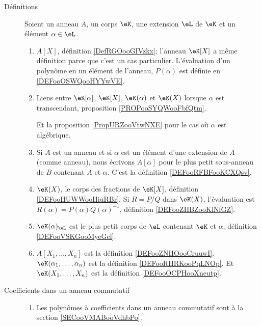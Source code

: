 
\begin{description}
    \item[Définitions]
        Soient un anneau \( A\), un corps \( \eK\), une extension \( \eL\) de \( \eK\) et un élément \( \alpha\in \eL\).
        \begin{enumerate}
            \item
                \( A[X]\), définition \ref{DefRGOooGIVzkx}; l'anneau \( \eK[X]\) a même définition parce que c'est un cas particulier. L'évaluation d'un polynôme en un élément de l'anneau, \( P(\alpha)\) est définie en \ref{DEFooOSWQooHYYwVE}.
            \item
                Liens entre \( \eK[\alpha]\), \( \eK[X]\), \( \eK(\alpha)\) et \( \eK(X)\) lorsque \( \alpha\) est transcendant, proposition \ref{PROPooSYQWooFbfQtm}.

                Et la proposition \ref{PropURZooVtwNXE} pour le cas où \( \alpha\) est algébrique.
            \item 
                Si \( A\) est un anneau et si \( \alpha\) est un élément d'une extension de \( A\) (comme anneau), nous écrivons \( A[\alpha]\) pour le plus petit sous-anneau de \( B\) contenant \( A\) et \( \alpha\). C'est la définition \ref{DEFooRFBFooKCXQsv}.
            \item
                \( \eK(X)\), le corps des fractions de \( \eK[X]\), définition \ref{DEFooHUWWooHiuRBr}. Si \( R=P/Q\) dans \( \eK(X)\), l'évaluation est \( R(\alpha)=P(\alpha)Q(\alpha)^{-1}\), définition \ref{DEFooZHBZooKlNfGZ}.
            \item
                \( \eK(\alpha)_{\eL}\) est le plus petit corps de \( \eL\) contenant \( \eK\) et \( \alpha\), définition \ref{DEFooVSKGooMyeGel}.
            \item
                \( A[X_1,\ldots, X_n]\) est la définition \ref{DEFooZNHOooCruuwI}. \( \eK(\alpha_1,\ldots, \alpha_n)\) est la définition \ref{DEFooRHRKooPqLNOp}. Et \( \eK(X_1,\ldots, X_n)\) est la définition \ref{DEFooOCPHooXneutp}.
        \end{enumerate}

    \item[Coefficients dans un anneau commutatif]

        \begin{enumerate}
            \item
Les polynômes à coefficients dans un anneau commutatif  sont à la section \ref{SECooVMABooVdhbPo}.
        \end{enumerate}
        


\end{description}
